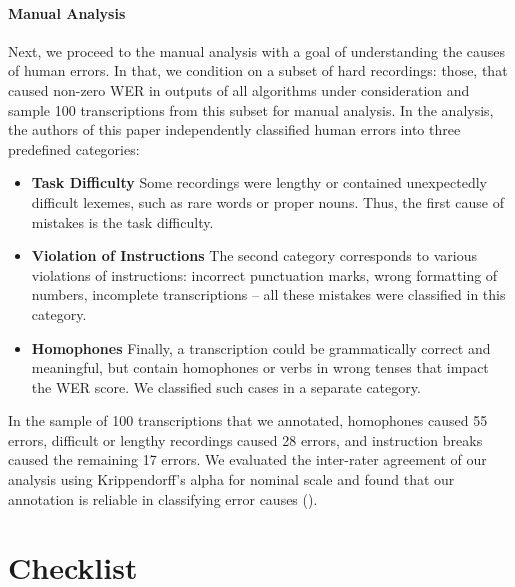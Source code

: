\documentclass{article}
\begin{document}
\paragraph{Manual Analysis} Next, we proceed to the manual analysis with a goal of understanding the causes of human errors. In that, we condition on a subset of hard recordings: those, that caused non-zero WER in outputs of all algorithms under consideration and sample 100 transcriptions from this subset for manual analysis. In the analysis, the authors of this paper independently classified human errors into three predefined categories:
\begin{itemize}[itemsep=0pt, leftmargin=15pt, topsep=0pt]
    \item \textbf{Task Difficulty} Some recordings were lengthy or contained unexpectedly difficult lexemes, such as rare words or proper nouns. Thus, the first cause of mistakes is the task difficulty.
    
    \item \textbf{Violation of Instructions} The second category corresponds to various violations of instructions: incorrect punctuation marks, wrong formatting of numbers, incomplete transcriptions -- all these mistakes were classified in this category.

    \item \textbf{Homophones} Finally, a transcription could be grammatically correct and meaningful, but contain homophones or verbs in wrong tenses that impact the WER score. We classified such cases in a separate category.
\end{itemize}


In the sample of 100 transcriptions that we annotated, homophones caused 55 errors, difficult or lengthy recordings caused 28 errors, and instruction breaks caused the remaining 17 errors. We evaluated the inter-rater agreement of our analysis using Krippendorff's alpha for nominal scale and found that our annotation is reliable in classifying error causes ().

\clearpage

\section*{Checklist}
\end{document}

